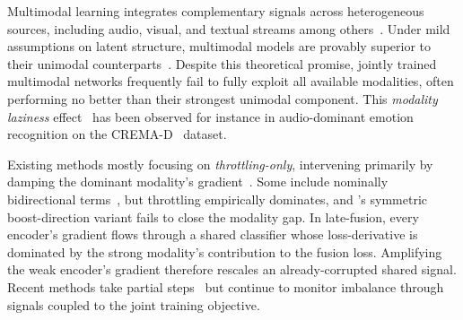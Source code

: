\documentclass{article}
\begin{document}

Multimodal learning integrates complementary signals across heterogeneous sources, including audio, visual, and textual streams among others~\citep{baltrusaitis2019multimodal}. Under mild assumptions on latent structure, multimodal models are provably superior to their unimodal counterparts~\citep{huang2021multimodal}. Despite this theoretical promise, jointly trained multimodal networks frequently fail to fully exploit all available modalities, often performing no better than their strongest unimodal component. This \emph{modality laziness} effect~\citep{wang2020gblending,peng2022ogmge,du2023suppression} has been observed for instance in audio-dominant emotion recognition on the CREMA-D~\citep{cao2014cremad} dataset.


Existing methods mostly focusing on \emph{throttling-only}, intervening primarily by damping the dominant modality's gradient~\citep{peng2022ogmge,wei2024mmpareto,guo2024cggm,wei2024opm,fan2023pmr,kontras2024mlgm}. Some include nominally bidirectional terms~\citep{li2023agm,gao2025arm,huang2025inforeg,wei2025improving}, but throttling empirically dominates, and \citet{wei2024opm}'s symmetric boost-direction variant fails to close the modality gap. In late-fusion, every encoder's gradient flows through a shared classifier whose loss-derivative is dominated by the strong modality's contribution to the fusion loss. Amplifying the weak encoder's gradient therefore rescales an already-corrupted shared signal. Recent methods take partial steps~\citep{yang2025iprm,jiang2025aug} but continue to monitor imbalance through signals coupled to the joint training objective.

\end{document}
